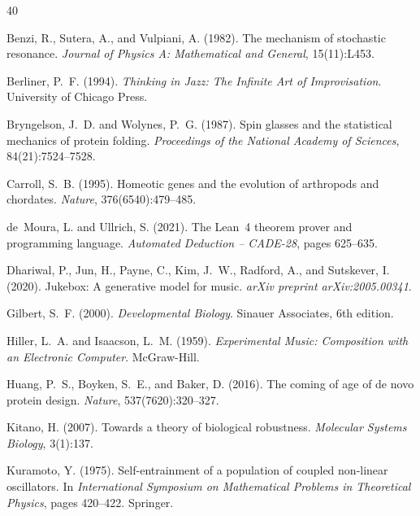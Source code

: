 \documentclass[11pt,a4paper]{article}
\begin{document}
\begin{thebibliography}{40}

Benzi, R., Sutera, A., and Vulpiani, A. (1982).
\newblock The mechanism of stochastic resonance.
\newblock \emph{Journal of Physics A: Mathematical and General}, 15(11):L453.

Berliner, P.~F. (1994).
\newblock \emph{Thinking in Jazz: The Infinite Art of Improvisation}.
\newblock University of Chicago Press.

Bryngelson, J.~D. and Wolynes, P.~G. (1987).
\newblock Spin glasses and the statistical mechanics of protein folding.
\newblock \emph{Proceedings of the National Academy of Sciences}, 84(21):7524--7528.

Carroll, S.~B. (1995).
\newblock Homeotic genes and the evolution of arthropods and chordates.
\newblock \emph{Nature}, 376(6540):479--485.

de~Moura, L. and Ullrich, S. (2021).
\newblock The Lean~4 theorem prover and programming language.
\newblock \emph{Automated Deduction -- CADE-28}, pages 625--635.

Dhariwal, P., Jun, H., Payne, C., Kim, J.~W., Radford, A., and Sutskever, I. (2020).
\newblock Jukebox: A generative model for music.
\newblock \emph{arXiv preprint arXiv:2005.00341}.

Gilbert, S.~F. (2000).
\newblock \emph{Developmental Biology}.
\newblock Sinauer Associates, 6th edition.

Hiller, L.~A. and Isaacson, L.~M. (1959).
\newblock \emph{Experimental Music: Composition with an Electronic Computer}.
\newblock McGraw-Hill.

Huang, P.~S., Boyken, S.~E., and Baker, D. (2016).
\newblock The coming of age of de novo protein design.
\newblock \emph{Nature}, 537(7620):320--327.

Kitano, H. (2007).
\newblock Towards a theory of biological robustness.
\newblock \emph{Molecular Systems Biology}, 3(1):137.

Kuramoto, Y. (1975).
\newblock Self-entrainment of a population of coupled non-linear oscillators.
\newblock In \emph{International Symposium on Mathematical Problems in Theoretical Physics}, pages 420--422. Springer.


\end{thebibliography}
\end{document}
